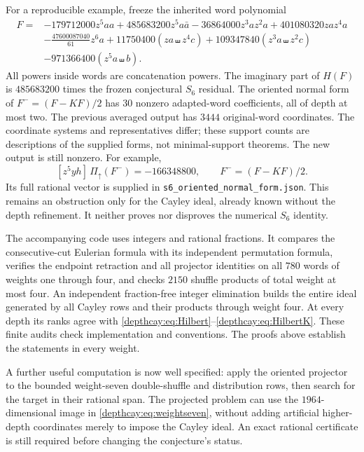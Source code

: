 For a reproducible example, freeze the inherited word polynomial
\cite[Eq.~\texttt{cay:eq:target}]{depth:PriorProjection}
\begin{align*}
F={}&-179712000z^5aa+485683200z^5a\bar a
       -36864000z^3az^2a+401080320zaz^4a\\
 &-\frac{47600087040}{61}z^6a
       +11750400(za\shuffle z^4c)
       +109347840(z^3a\shuffle z^2c)\\
 &-971366400(z^5a\shuffle b).
\end{align*}
All powers inside words are concatenation powers. The imaginary part
of $H(F)$ is $485683200$ times the frozen conjectural $S_6$ residual.
The oriented normal form of $F^-=(F-KF)/2$ has $30$ nonzero
adapted-word coefficients, all
of depth at most two. The previous averaged output has $3444$ original-word
coordinates. The coordinate systems and representatives differ; these
support counts are descriptions of the supplied forms, not minimal-support
theorems. The new output is still nonzero. For example,
\[
 [z^5yh]\,\Pi_{\uparrow}(F^-)= -166348800,
 \qquad F^-=(F-KF)/2.
\]
Its full rational vector is supplied in
\texttt{s6\_oriented\_normal\_form.json}. This remains an obstruction
only for the Cayley ideal, already known without the depth refinement.
It neither proves nor disproves the numerical $S_6$ identity.

The accompanying code uses integers and rational fractions. It compares
the consecutive-cut Eulerian formula with its independent permutation
formula, verifies the endpoint retraction and all projector identities
on all $780$ words of weights one through four, and checks $2150$
shuffle products of total weight at most four. An independent
fraction-free integer elimination builds the entire ideal generated by
all Cayley rows and their products through weight four. At every depth
its ranks agree with \eqref{depthcay:eq:Hilbert}--\eqref{depthcay:eq:HilbertK}.
These finite audits check implementation and conventions. The proofs
above establish the statements in every weight.

A further useful computation is now well specified: apply the oriented
projector to the bounded weight-seven double-shuffle and distribution
rows, then search for the target in their rational span. The projected
problem can use the $1964$-dimensional image in
\eqref{depthcay:eq:weightseven}, without adding artificial higher-depth
coordinates merely to impose the Cayley ideal. An exact rational
certificate is still required before changing the conjecture's status.

